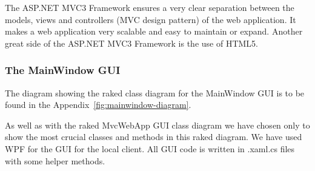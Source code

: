 The ASP.NET MVC3 Framework ensures a very clear separation between the models, views and controllers (MVC design pattern) of the web application. It makes a web application 
very scalable and easy to maintain or expand. Another great side of the ASP.NET MVC3 Framework is the use of HTML5.

\subsubsection{The MainWindow GUI}

The diagram showing the raked class diagram for the MainWindow GUI is to be found in the Appendix~\ref{fig:mainwindow-diagram}.

As well as with the raked MvcWebApp GUI class diagram we have chosen only to show the most crucial classes and methods in this raked diagram. We have used WPF for
the GUI for the local client. All GUI code is written in .xaml.cs files with some helper methods.

